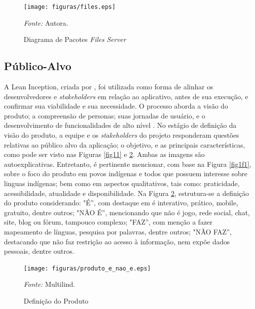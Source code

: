 \begin{figure}[h!]
	\centering
	\caption{Diagrama de Pacotes \textit{Files Server}}
	\begin{adjustbox}{center}
		\texttt{[image: figuras/files.eps]}
	\end{adjustbox}
	\begin{tablenotes}[flushleft]
		\centering
		\item \textit{Fonte:} Autora.
	\end{tablenotes}
	\label{fig10}
\end{figure}

\subsection{Público-Alvo}
\label{Publico-Alvo}
A Lean Inception, criada por , foi utilizada como forma de alinhar os desenvolvedores e \textit{stakeholders} em relação ao aplicativo, antes de sua execução, e confirmar sua viabilidade e sua necessidade. O processo aborda a visão do produto; a compreensão de personas; suas jornadas de usuário, e 
o desenvolvimento de funcionalidades de alto nível \cite{lean}. No estágio de definição da visão do produto, a equipe e os \textit{stakeholders} do projeto responderam questões relativas ao público alvo da aplicação; o objetivo, e as principais características, como pode ser visto nas 
Figuras \ref{fig11} e \ref{fig12}. Ambas as imagens são autoexplicativas. Entretanto, é pertinente mencionar, com base na Figura \ref{fig1f1}, sobre o foco do produto em povos indígenas e todos que possuem interesse sobre linguas indígenas; bem como em aspectos qualitativos, tais como: praticidade, acessibilidade, atualidade 
e disponibilidade. Na Figura \ref{fig12}, estrutura-se a definição do produto considerando: "É'', com destaque em é interativo, prático, mobile, gratuito, dentre outros; "NÃO É'', mencionando que não é jogo, rede social, chat, site, blog ou fórum, tampouco complexo; "FAZ'', com menção a fazer mapeamento de línguas, 
pesquisa por palavras, dentre outros; "NÃO FAZ'', destacando que não faz restrição ao acesso à informação, nem expõe dados pessoais, dentre outros.

\begin{figure}[h!]
	\centering
	\caption{Definição do Produto}
	\begin{adjustbox}{center}
		\texttt{[image: figuras/produto\_e\_nao\_e.eps]}
	\end{adjustbox}
	\begin{tablenotes}[flushleft]
		\centering
		\item \textit{Fonte:} Multilind.
	\end{tablenotes}
	\label{fig12}
\end{figure}

